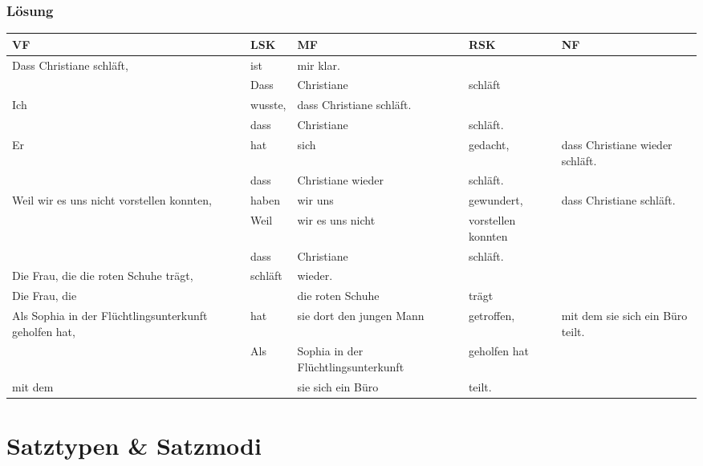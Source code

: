 \begin{frame}
\frametitle{Lösung}

\begin{table}
\centering
\begin{tabular}{p{2cm}|l|p{2cm}|l|p{2cm}}
\textbf{VF} & \textbf{LSK} & \textbf{MF} & \textbf{RSK} & \textbf{NF} \\ 
\hline
Dass Christiane schläft, & ist & mir klar. & & \\
& Dass & Christiane & schläft & \\
\hline
Ich & wusste, & dass Christiane schläft. & & \\
& dass & Christiane & schläft. & \\
\hline
Er & hat & sich & gedacht, & dass Christiane wieder schläft. \\
& dass & Christiane wieder & schläft. & \\
\hline
Weil wir es uns nicht vorstellen konnten, & haben & wir uns & gewundert, & dass Christiane schläft.\\
& Weil & wir es uns nicht & vorstellen konnten & \\
& dass & Christiane & schläft. & \\
\hline
Die Frau, die die roten Schuhe trägt, & schläft & wieder. & & \\
Die Frau, die & & die roten Schuhe & trägt & \\
\hline
Als Sophia in der Flüchtlingsunterkunft geholfen hat, & hat & sie dort den jungen Mann & getroffen, & mit dem sie sich ein Büro teilt. \\
& Als & Sophia in der Flüchtlingsunterkunft & geholfen hat & \\
mit dem & & sie sich ein Büro & teilt. & \\
\end{tabular}
\end{table}

\end{frame}
\section{Satztypen \& Satzmodi}


